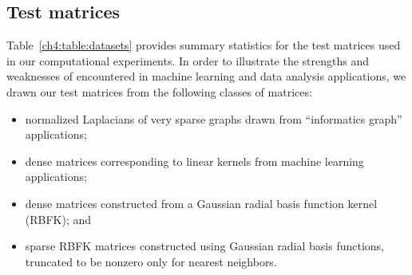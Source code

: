 

\subsection{Test matrices}
\label{ch4:sxn:emp-datasets}

Table~\ref{ch4:table:datasets} provides summary statistics for the test matrices used 
in our computational experiments. 
In order to illustrate the strengths and weaknesses of 
encountered in machine learning and data analysis applications, we drawn our test
matrices from the following classes of matrices: 
\begin{itemize}
\item normalized Laplacians of very sparse graphs drawn from ``informatics graph'' 
applications;
\item dense matrices corresponding to linear kernels from machine learning 
applications;
\item dense matrices constructed from a Gaussian radial basis function kernel 
(RBFK); and
\item sparse RBFK matrices constructed using Gaussian radial basis functions, 
truncated to be nonzero only for nearest neighbors.
\end{itemize}


